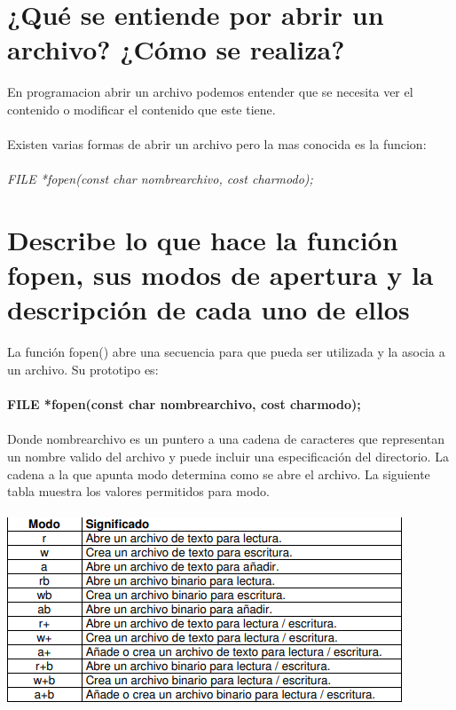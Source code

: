 \documentclass{article}
\begin{document}

\section{¿Qué se entiende por abrir un archivo? ¿Cómo se realiza?}
    En programacion abrir un archivo podemos entender que se necesita ver el contenido o modificar el contenido que este tiene.
    \\\\
    Existen varias formas de abrir un archivo pero la mas conocida es la funcion:
    \\\\
    \textit{FILE *fopen(const char nombrearchivo, cost charmodo);}


\section{Describe lo que hace la función fopen, sus modos de apertura y la descripción de cada uno de ellos}
    La función fopen() abre una secuencia para que pueda ser utilizada y la asocia a un archivo. Su prototipo es:
    \\\\
    \textbf{FILE *fopen(const char nombrearchivo, cost charmodo);}
    \\\\
    Donde nombrearchivo es un puntero a una cadena de caracteres que representan un nombre valido del archivo y puede incluir una especificación del directorio. La cadena a la que apunta modo determina como se abre el archivo. La siguiente tabla muestra los valores permitidos para modo.
    \\\\
    \includegraphics{./Modos.PNG}
\end{document}
